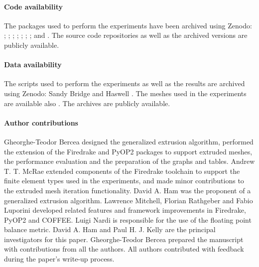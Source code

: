 \documentclass[11pt, a4paper]{scrartcl}
\begin{document}
\paragraph{Code availability}
The packages used to perform the experiments have been archived using
Zenodo: \cite{zenodo_firedrake}; \cite{zenodo_petsc};
\cite{zenodo_petsc4py}; \cite{zenodo_fiat}; \cite{zenodo_ufl};
\cite{zenodo_ffc}; \cite{zenodo_pyop2}; and
\cite{zenodo_coffee}. The source code repositories as well as the
archived versions are publicly available.

\paragraph{Data availability}
The scripts used to perform the experiments as well as the results are
archived using Zenodo: Sandy Bridge \citep{bercea_2016_61920} and
Haswell \citep{bercea_2016_61919}. The meshes used in the experiments
are available also \citep{bercea_2016_61819}. The archives are
publicly available.

\paragraph{Author contributions}
Gheorghe-Teodor Bercea designed the generalized extrusion algorithm,
performed the extension of the Firedrake and PyOP2 packages to support
extruded meshes, the performance evaluation and the preparation of the
graphs and tables. Andrew T. T. McRae extended components of the
Firedrake toolchain to support the finite element types used in the
experiments, and made minor contributions to the extruded mesh
iteration functionality. David A. Ham was the proponent of a
generalized extrusion algorithm. Lawrence Mitchell, Florian Rathgeber
and Fabio Luporini developed related features and framework
improvements in Firedrake, PyOP2 and COFFEE. Luigi Nardi is
responsible for the use of the floating point balance metric. David
A. Ham and Paul H. J. Kelly are the principal investigators for this
paper. Gheorghe-Teodor Bercea prepared the manuscript with
contributions from all the authors. All authors contributed with
feedback during the paper's write-up process.
\end{document}
